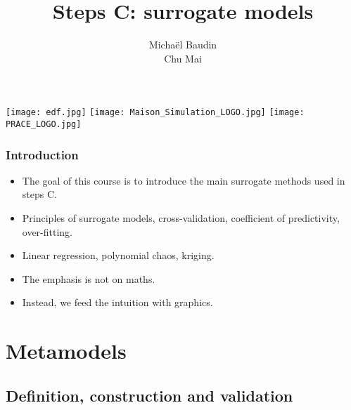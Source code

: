 \documentclass{beamer}
\title{Steps C: surrogate models}
\author[M. Baudin]{Michaël Baudin\\Chu Mai}
\begin{document}

\begin{frame}
\titlepage
  
\begin{center}
\texttt{[image: edf.jpg]}
\hspace{1cm}
\texttt{[image: Maison\_Simulation\_LOGO.jpg]}
\hspace{1cm}
\texttt{[image: PRACE\_LOGO.jpg]}
\end{center}

\end{frame}


\begin{frame}
\frametitle{Introduction}

\begin{itemize}
\item The goal of this course is to introduce the main surrogate methods used in 
steps C. 

\item Principles of surrogate models, cross-validation, coefficient of predictivity, over-fitting.

\item Linear regression, polynomial chaos, kriging.

\item The emphasis is not on maths. 

\item Instead, we feed the intuition with graphics. 
\end{itemize}

\end{frame}


\begin{frame}
\begin{multicols}{2}
  {\tableofcontents[hideallsubsections]}
\end{multicols}
\end{frame}


\section{Metamodels}

\subsection{Definition, construction and validation}
\end{document}
